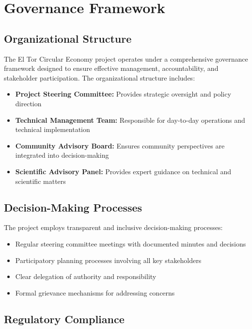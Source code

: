 \section{Governance Framework}

\subsection{Organizational Structure}

The El Tor Circular Economy project operates under a comprehensive governance framework designed to ensure effective management, accountability, and stakeholder participation. The organizational structure includes:

\begin{itemize}
    \item \textbf{Project Steering Committee:} Provides strategic oversight and policy direction
    \item \textbf{Technical Management Team:} Responsible for day-to-day operations and technical implementation
    \item \textbf{Community Advisory Board:} Ensures community perspectives are integrated into decision-making
    \item \textbf{Scientific Advisory Panel:} Provides expert guidance on technical and scientific matters
\end{itemize}

\subsection{Decision-Making Processes}

The project employs transparent and inclusive decision-making processes:

\begin{itemize}
    \item Regular steering committee meetings with documented minutes and decisions
    \item Participatory planning processes involving all key stakeholders
    \item Clear delegation of authority and responsibility
    \item Formal grievance mechanisms for addressing concerns
\end{itemize}

\subsection{Regulatory Compliance}

